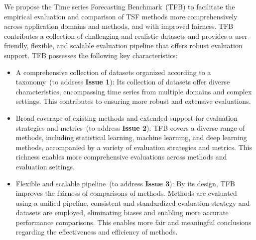 \documentclass[sigconf, nonacm, pdfa]{acmart}
\begin{document}
We propose the Time series Forecasting Benchmark~(TFB) to facilitate the empirical evaluation and comparison of TSF methods more comprehensively across application domains and methods, and with improved fairness. TFB contributes a collection of challenging and realistic datasets and provides a user-friendly, flexible, and scalable evaluation pipeline that offers robust evaluation support. TFB possesses the following key characteristics: 
\begin{itemize}[left=0.1cm]
\item A comprehensive collection of datasets organized according to a taxonomy~(to address \textbf{Issue 1}): Its collection of datasets offer diverse characteristics, encompassing time series from multiple domains and complex settings. This contributes to ensuring more robust and extensive evaluations.
\item Broad coverage of existing methods and extended support for evaluation strategies and metrics~(to address \textbf{Issue 2}): TFB covers a diverse range of methods, including statistical learning, machine learning, and deep learning methods, accompanied by a variety of evaluation strategies and metrics. This richness enables more comprehensive evaluations across methods and evaluation settings.
\item Flexible and scalable pipeline~(to address \textbf{Issue 3}): By its design, TFB improves the fairness of comparisons of methods. Methods are evaluated using a unified pipeline, consistent and standardized evaluation strategy and datasets are employed, eliminating biases and enabling more accurate performance comparisons. This enables more fair and meaningful conclusions regarding the effectiveness and efficiency of methods.
\end{itemize}
\end{document}
